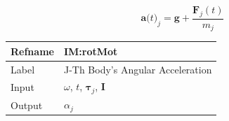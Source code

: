 \documentclass[12pt]{article}
\begin{document}
\begin{displaymath}
{\symbf{a}\text{(}t\text{)}_{j}}=\symbf{g}+\frac{{\symbf{F}_{j}}\left(t\right)}{{m_{j}}}
\end{displaymath}
\vspace{\baselineskip}
\noindent
\begin{minipage}{\textwidth}
\begin{tabular}{>{\raggedright}p{}>{\raggedright\arraybackslash}p{}}
\toprule \textbf{Refname} & \textbf{IM:rotMot}
\label{IM:rotMot}
\\ \midrule
Label & J-Th Body's Angular Acceleration
        
\\ \midrule
Input & $ω$, $t$, ${\symbf{τ}_{j}}$, $\symbf{I}$
        
\\ \midrule
Output & ${α_{j}}$
         

\end{tabular}
\end{minipage}
\end{document}
